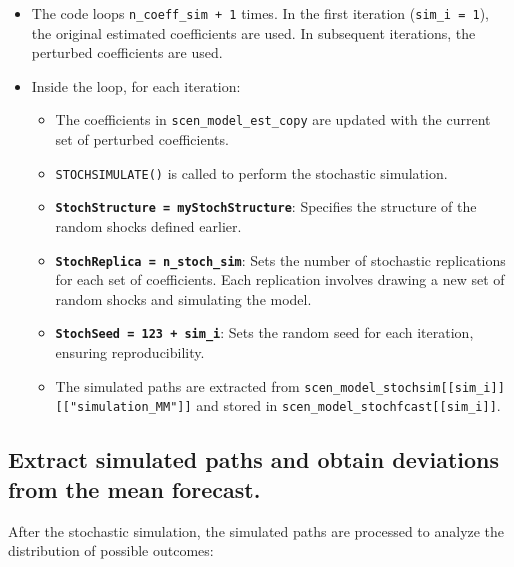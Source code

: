 \documentclass[
  letterpaper,
  DIV=11,
  numbers=noendperiod]{scrreport}
\providecommand{\tightlist}{%
  \setlength{\itemsep}{0pt}\setlength{\parskip}{0pt}}\usepackage{longtable,booktabs,array}
\begin{document}
\begin{itemize}
\tightlist
\item
  The code loops \texttt{n\_coeff\_sim\ +\ 1} times. In the first
  iteration (\texttt{sim\_i\ =\ 1}), the original estimated coefficients
  are used. In subsequent iterations, the perturbed coefficients are
  used.
\item
  Inside the loop, for each iteration:

  \begin{itemize}
  \tightlist
  \item
    The coefficients in \texttt{scen\_model\_est\_copy} are updated with
    the current set of perturbed coefficients.
  \item
    \texttt{STOCHSIMULATE()} is called to perform the stochastic
    simulation.
  \item
    \textbf{\texttt{StochStructure\ =\ myStochStructure}}: Specifies the
    structure of the random shocks defined earlier.
  \item
    \textbf{\texttt{StochReplica\ =\ n\_stoch\_sim}}: Sets the number of
    stochastic replications for each set of coefficients. Each
    replication involves drawing a new set of random shocks and
    simulating the model.
  \item
    \textbf{\texttt{StochSeed\ =\ 123\ +\ sim\_i}}: Sets the random seed
    for each iteration, ensuring reproducibility.
  \item
    The simulated paths are extracted from
    \texttt{scen\_model\_stochsim{[}{[}sim\_i{]}{]}{[}{[}"simulation\_MM"{]}{]}}
    and stored in \texttt{scen\_model\_stochfcast{[}{[}sim\_i{]}{]}}.
  \end{itemize}
\end{itemize}

\subsection{Extract simulated paths and obtain deviations from the mean
forecast.}\label{extract-simulated-paths-and-obtain-deviations-from-the-mean-forecast.}

After the stochastic simulation, the simulated paths are processed to
analyze the distribution of possible outcomes:
\end{document}
